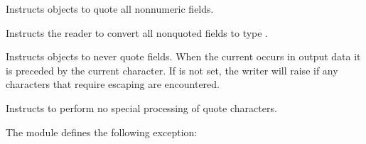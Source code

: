 \documentclass[letterpaper,10pt,english]{sphinxmanual}
\begin{document}

\vspace{5px}

\begin{fulllineitems}
\label{\detokenize{csv:csv.QUOTE_NONNUMERIC}}
Instructs {\hyperref[\detokenize{csv:csv.writer}]{}} objects to quote all non\sphinxhyphen{}numeric fields.

Instructs the reader to convert all non\sphinxhyphen{}quoted fields to type .

\end{fulllineitems}


\vspace{5px}

\begin{fulllineitems}
\label{\detokenize{csv:csv.QUOTE_NONE}}
Instructs {\hyperref[\detokenize{csv:csv.writer}]{}} objects to never quote fields.  When the current
 occurs in output data it is preceded by the current 
character.  If  is not set, the writer will raise {\hyperref[\detokenize{csv:csv.Error}]{}} if
any characters that require escaping are encountered.

Instructs {\hyperref[\detokenize{csv:csv.reader}]{}} to perform no special processing of quote characters.

\end{fulllineitems}


The {\hyperref[\detokenize{csv:module-csv}]{}} module defines the following exception:
\end{document}
